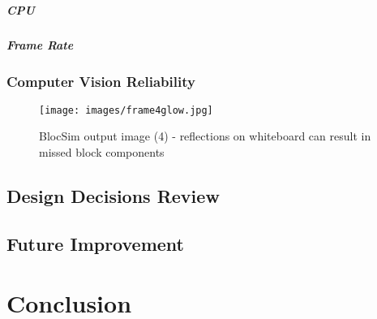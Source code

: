\paragraph{CPU}



\paragraph{Frame Rate}



\subsection{Computer Vision Reliability}

\begin{figure}[ht!]
\centering
\texttt{[image: images/frame4glow.jpg]}
\caption{BlocSim output image (4) - reflections on whiteboard can result in missed block components}
\label{im:frame4glow}
\end{figure}


\section{Design Decisions Review}



\section{Future Improvement}




\chapter{Conclusion}






\begin{comment}

\end{comment}

